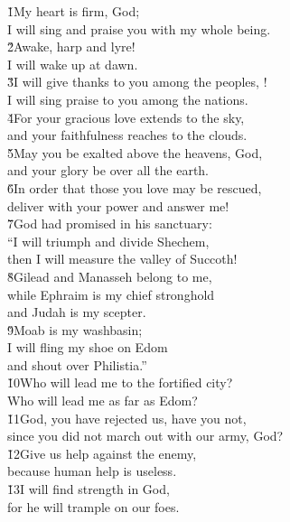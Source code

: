 \begin{poetry}
\poeml \v{1}My heart is firm, God; \\
\poemll    I will sing and praise you with my whole being. \\
\poeml \v{2}Awake, harp and lyre! \\
\poemll    I will wake up at dawn. \\
\poeml \v{3}I will give thanks to you among the peoples, ! \\
\poemll    I will sing praise to you among the nations. \\
\poeml \v{4}For your gracious love extends to the sky, \\
\poemll    and your faithfulness reaches to the clouds. \\
\poeml \v{5}May you be exalted above the heavens, God, \\
\poemll    and your glory be over all the earth. \\
\poeml \v{6}In order that those you love may be rescued, \\
\poemll    deliver with your power and answer me! \\
\poeml \v{7}God had promised in his sanctuary: \\
\poeml ``I will triumph and divide Shechem, \\
\poemll    then I will measure the valley of Succoth! \\
\poeml \v{8}Gilead and Manasseh belong to me, \\
\poemll    while Ephraim is my chief stronghold \\
\poemlll       and Judah is my scepter. \\
\poeml \v{9}Moab is my washbasin; \\
\poemll    I will fling my shoe on Edom \\
\poemlll       and shout over Philistia.'' \\
\poeml \v{10}Who will lead me to the fortified city? \\
\poemll    Who will lead me as far as Edom? \\
\poeml \v{11}God, you have rejected us, have you not, \\
\poemll    since you did not march out with our army, God? \\
\poeml \v{12}Give us help against the enemy, \\
\poemll    because human help is useless. \\
\poeml \v{13}I will find strength in God, \\
\poemll    for he will trample on our foes.
\end{poetry}


